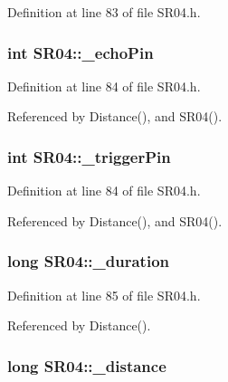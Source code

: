 Definition at line 83 of file SR04.h.\hypertarget{class_s_r04_455266efca39151130844ade8a71c2bd}{
\subsubsection[\_\-echoPin]{\setlength{\rightskip}{0pt plus 5cm}int {\bf SR04::\_\-echoPin}}}
\label{class_s_r04_455266efca39151130844ade8a71c2bd}




Definition at line 84 of file SR04.h.

Referenced by Distance(), and SR04().\hypertarget{class_s_r04_093339f25a9fea6bcac46db6f8c8d4b1}{
\subsubsection[\_\-triggerPin]{\setlength{\rightskip}{0pt plus 5cm}int {\bf SR04::\_\-triggerPin}}}
\label{class_s_r04_093339f25a9fea6bcac46db6f8c8d4b1}




Definition at line 84 of file SR04.h.

Referenced by Distance(), and SR04().\hypertarget{class_s_r04_f88aad0e86e807d7d91b989a9da66649}{
\subsubsection[\_\-duration]{\setlength{\rightskip}{0pt plus 5cm}long {\bf SR04::\_\-duration}}}
\label{class_s_r04_f88aad0e86e807d7d91b989a9da66649}




Definition at line 85 of file SR04.h.

Referenced by Distance().\hypertarget{class_s_r04_9edb2f2f92286328ec96704dd12b985c}{
\subsubsection[\_\-distance]{\setlength{\rightskip}{0pt plus 5cm}long {\bf SR04::\_\-distance}}}
\label{class_s_r04_9edb2f2f92286328ec96704dd12b985c}





